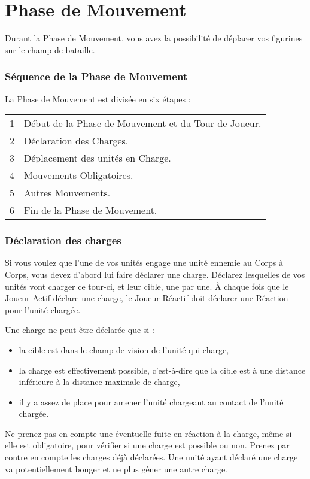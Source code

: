 
\part{Phase de Mouvement}

Durant la Phase de Mouvement, vous avez la possibilité de déplacer vos figurines sur le champ de bataille.

\section{Séquence de la Phase de Mouvement}

La Phase de Mouvement est divisée en six étapes :

\hspace*{0.3cm}
\begin{tabular}{c|l}
1 & Début de la Phase de Mouvement et du Tour de Joueur. \tabularnewline
2 & Déclaration des Charges. \tabularnewline
3 & Déplacement des unités en Charge. \tabularnewline
4 & Mouvements Obligatoires. \tabularnewline
5 & Autres Mouvements. \tabularnewline
6 & Fin de la Phase de Mouvement. \tabularnewline
\end{tabular}


\section{Déclaration des charges}

Si vous voulez que l'une de vos unités engage une unité ennemie au Corps à Corps, vous devez d'abord lui faire déclarer une charge. Déclarez lesquelles de vos unités vont charger ce tour-ci, et leur cible, une par une. À chaque fois que le Joueur Actif déclare une charge, le Joueur Réactif doit déclarer une Réaction pour l'unité chargée.

Une charge ne peut être déclarée que si :
\begin{itemize}[label={-}]
\item la cible est dans le champ de vision de l'unité qui charge,
\item la charge est effectivement possible, c'est-à-dire que la cible est à une distance inférieure à la distance maximale de charge,
\item il y a assez de place pour amener l'unité chargeant au contact de l'unité chargée.
\end{itemize}
Ne prenez pas en compte une éventuelle fuite en réaction à la charge, même si elle est obligatoire, pour vérifier si une charge est possible ou non. Prenez par contre en compte les charges déjà déclarées. Une unité ayant déclaré une charge va potentiellement bouger et ne plus gêner une autre charge.


